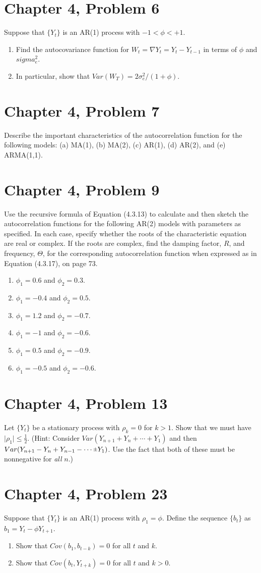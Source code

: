 \documentclass[11pt]{article}
\newif\ifclearpage
\newcommand{\rpm}{\sbox0{$1$}\sbox2{$\scriptstyle\pm$}
  \raise\dimexpr(\ht0-\ht2)/2\relax\box2 }
\newcommand{\problem}[1]{\section*{#1}}
\newcommand{\solution}{\hrulefill}
\newcommand{\maybeclearpage}{\ifclearpage\clearpage\fi}
\begin{document}
\problem{Chapter 4, Problem 6}
Suppose that $\{Y_t\}$ is an AR(1) process with $-1 < \phi < +1$.
\begin{enumerate}
	\item Find the autocovariance function for $W_t = \nabla Y_t = Y_t - Y_{t-1}$ in terms of $\phi$ and $sigma_e^2$.
	\item In particular, show that $Var(W_T) = 2\sigma_e^2/(1+\phi)$.
\end{enumerate}

\solution


\maybeclearpage
\problem{Chapter 4, Problem 7}
Describe the important characteristics of the autocorrelation function for the following models: (a) MA(1), (b) MA(2), (c) AR(1), (d) AR(2), and (e) ARMA(1,1).

\solution



\maybeclearpage
\problem{Chapter 4, Problem 9}
Use the recursive formula of Equation (4.3.13) to calculate and then sketch the autocorrelation functions for the following AR(2) models with parameters as specified. In each case, specify whether the roots of the characteristic equation are real or complex. If the roots are complex, find the damping factor, $R$, and frequency, $\Theta$, for the corresponding autocorrelation function when expressed as in Equation (4.3.17), on page 73.
\begin{enumerate}
	\item $\phi_1 = 0.6$ and $\phi_2 = 0.3$.
	\item $\phi_1 = -0.4$ and $\phi_2 = 0.5$.
	\item $\phi_1 = 1.2$ and $\phi_2 = -0.7$.
	\item $\phi_1 = -1$ and $\phi_2 = -0.6$.
	\item $\phi_1 = 0.5$ and $\phi_2 = -0.9$.
	\item $\phi_1 = -0.5$ and $\phi_2 = -0.6$.
\end{enumerate}
\solution


\maybeclearpage
\problem{Chapter 4, Problem 13}
Let $\{Y_t\}$ be a stationary process with $\rho_k = 0$ for $k > 1$. Show that we must have $\mid \rho_1 \mid \leq \frac{1}{2}$. (Hint: Consider $Var(Y_{n+1} + Y_n + \cdots + Y_1)$ and then $Var(Y_{n+1} - Y_n + Y_{n-1} - \cdots \rpm Y_1)$. Use the fact that both of these must be nonnegative for \textit{all} $n$.)

\solution


\maybeclearpage
\problem{Chapter 4, Problem 23}
Suppose that $\{Y_t\}$ is an AR(1) process with $\rho_1 = \phi$. Define the sequence $\{b_t\}$ as $b_1 = Y_t - \phi Y_{t+1}$.
\begin{enumerate}
\item Show that $Cov(b_1,b_{t-k}) = 0$ for all $t$ and $k$.
\item Show that $Cov(b_t,Y_{t+k}) = 0$ for all $t$ and $k>0$.
\end{enumerate}

\solution

\maybeclearpage
\end{document}
